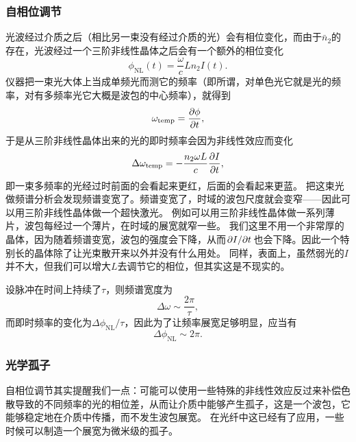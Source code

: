 \subsubsection{自相位调节}

光波经过介质之后（相比另一束没有经过介质的光）会有相位变化，而由于$\bar{n}_2$的存在，光波经过一个三阶非线性晶体之后会有一个额外的相位变化
\begin{equation}
    \phi_\text{NL}(t) = \frac{\omega}{c} L n_2 I(t).
    \label{eq:self-phase-adjustement}
\end{equation}
仪器把一束光大体上当成单频光而测它的频率（即所谓，对单色光它就是光的频率，对有多频率光它大概是波包的中心频率），就得到
\[
    \omega_\text{temp} = \pdv{\phi}{t},
\]
于是从三阶非线性晶体出来的光的即时频率会因为非线性效应而变化
\begin{equation}
    \Delta \omega_\text{temp} = - \frac{n_2 \omega L}{c} \pdv{I}{t},
    \label{eq:temp-phase-change}
\end{equation}
即一束多频率的光经过时前面的会看起来更红，后面的会看起来更蓝。
把这束光做频谱分析会发现频谱变宽了。频谱变宽了，时域的波包尺度就会变窄——因此可以用三阶非线性晶体做一个超快激光。
例如可以用三阶非线性晶体做一系列薄片，波包每经过一个薄片，在时域的展宽就窄一些。
我们这里不用一个非常厚的晶体，因为随着频谱变宽，波包的强度会下降，从而$\pdv*{I}{t}$也会下降。因此一个特别长的晶体除了让光束散开来以外并没有什么用处。
同样，表面上，虽然弱光的$I$并不大，但我们可以增大$L$去调节它的相位，但其实这是不现实的。

设脉冲在时间上持续了$\tau$，则频谱宽度为
\[
    \Delta \omega \sim \frac{2\pi}{\tau},
\]
而即时频率的变化为$\Delta \phi_\text{NL} / \tau$，因此为了让频率展宽足够明显，应当有
\begin{equation}
    \Delta \phi_\text{NL} \sim 2\pi.
\end{equation}

\subsubsection{光学孤子}

自相位调节其实提醒我们一点：可能可以使用一些特殊的非线性效应反过来补偿色散导致的不同频率的光的相位差，从而让介质中能够产生孤子，这是一个波包，它能够稳定地在介质中传播，而不发生波包展宽。
在光纤中这已经有了应用，一些时候可以制造一个展宽为微米级的孤子。

